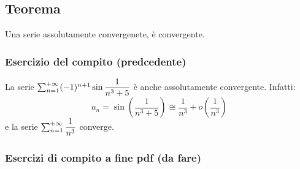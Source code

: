 \documentclass[../main.tex]{subfiles}
\begin{document}
\subsection{Teorema}
Una serie assolutamente convergenete, è convergente.

\subsubsection{Esercizio del compito (predcedente)}
La serie $\sum_{n=1}^{+\infty} (-1)^{n+1}\sin\dfrac{1}{n^3+5}$ è anche assolutamente
convergente. Infatti:
\[
    a_n = \sin \left(\dfrac{1}{n^3+5}\right) \cong \dfrac{1}{n^3} + o\left(\dfrac{1}{n^3}\right)
\]
e la serie $\sum_{n=1}^{+\infty} \dfrac{1}{n^3}$ converge.

\subsubsection{Esercizi di compito a fine pdf (da fare)}
\end{document}
